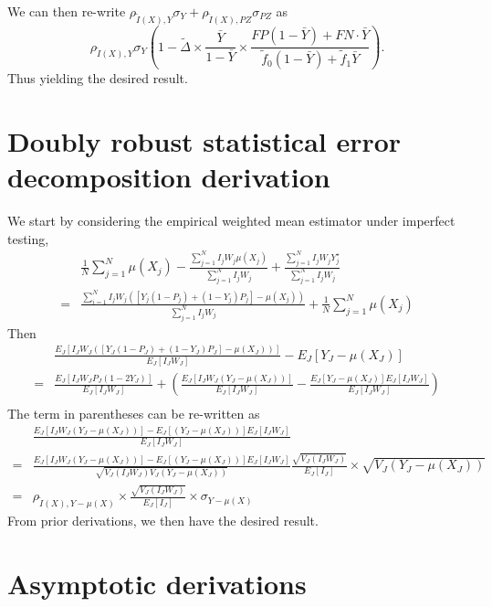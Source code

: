 \documentclass[12pt]{amsart}
\numberwithin{equation}{section}
\theoremstyle{plain}
\begin{document}
We can then re-write $\rho_{\tilde I (X),Y} \sigma_Y + \rho_{\tilde I(X),PZ} \sigma_{PZ}$ as
$$
\rho_{\tilde I(X),Y} \sigma_Y \left( 1 - \tilde \Delta \times \frac{\bar Y}{1-\bar Y} \times \frac{FP(1-\bar Y) + FN \cdot \bar Y}{\tilde f_0 (1-\bar Y) + \tilde f_1 \bar Y} \right).
$$
Thus yielding the desired result.

\section{Doubly robust statistical error decomposition derivation}
\label{app:DRderivation}
We start by considering the empirical weighted mean estimator under imperfect testing,
\begin{align*}
&\frac{1}{N} \sum_{j=1}^N \mu(X_j) - \frac{\sum_{j=1}^N I_j W_j \mu(X_j)}{\sum_{j=1}^N I_j W_j} + \frac{\sum_{j=1}^N I_j W_j Y_j^\star}{\sum_{j=1}^N I_j W_j} \\
=& \frac{\sum_{i=1}^N  I_j W_j \left( \left[ Y_j (1-P_j) + (1-Y_j) P_j \right] - \mu (X_j) \right)}{\sum_{j=1}^N  I_j W_j } + \frac{1}{N} \sum_{j=1}^N \mu(X_j
)
\end{align*}
Then
$$
\begin{aligned}
&\frac{E_J \left[ I_J W_J \left( \left[ Y_J (1-P_J) + (1-Y_J) P_J \right] - \mu(X_J) \right) \right]}{E_J [ I_J W_J ] } - E_J[Y_J -\mu (X_J)] \\
= &\frac{E_J \left[ I_J W_J P_J (1-2Y_J) \right]}{E_J [ I_J W_J ] } + \left( \frac{E_J [I_J W_J (Y_J -\mu (X_J))]}{E_J [ I_J W_J ] } - \frac{E_J[Y_J-\mu(X_J)] E_J[I_J W_J]}{E_J[I_J W_J]} \right) \\
\end{aligned}
$$
The term in parentheses can be re-written as
$$
\begin{aligned}
&\frac{E_J [I_J W_J (Y_J-\mu(X_J))]- E_J[(Y_J-\mu(X_J))] E_J[I_J W_J]}{E_J[I_J W_J]} \\
=  &\frac{E_J [I_J W_J (Y_J-\mu(X_J))]- E_J[(Y_J-\mu(X_J))] E_J[I_J W_J]}{\sqrt{V_J(I_J W_J) V_J(Y_J-\mu(X_J))}} \frac{\sqrt{V_J(I_J W_J)}}{E_J[I_J]} \times \sqrt{V_J(Y_J-\mu(X_J))} \\
= &\rho_{\tilde I (X),Y-\mu(X)} \times \frac{\sqrt{V_J(I_J W_J)}}{E_J[I_J]} \times \sigma_{Y-\mu(X)}
\end{aligned}
$$
From prior derivations, we then have the desired result.

\section{Asymptotic derivations}
\label{app:asympderivations}
\end{document}
